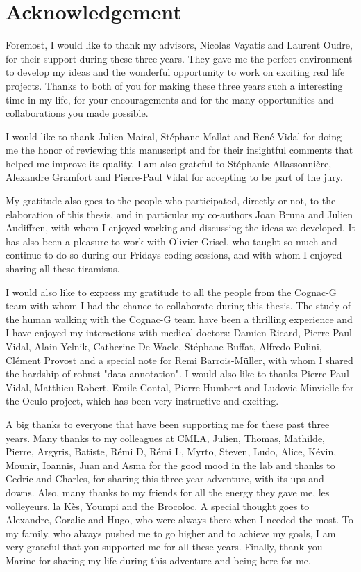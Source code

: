 \documentclass[../thesis.tex]{subfiles}
\begin{document}
\chapter*{Acknowledgement}


Foremost, I would like to thank my advisors, Nicolas Vayatis and Laurent Oudre, for
their support during these three years. They gave me the perfect environment to develop
my ideas and the wonderful opportunity to work on exciting real life projects. Thanks
to both of you for making these three years such a interesting time in my life,
for your encouragements and for the many opportunities and collaborations you
made possible.

I would like to thank Julien Mairal, Stéphane Mallat and René Vidal for
doing me the honor of reviewing this manuscript and for their insightful
comments that helped me improve its quality. I am also grateful to
Stéphanie Allassonnière, Alexandre Gramfort and Pierre-Paul Vidal for
accepting to be part of the jury.

My gratitude also goes to the people who participated, directly or not,
to the elaboration of this thesis, and in particular my co-authors
Joan Bruna and Julien Audiffren, with whom I enjoyed working and discussing
the ideas we developed. It has also been a pleasure to work with Olivier
Grisel, who taught so much and continue to do so during our Fridays coding
sessions, and with whom I enjoyed sharing all these tiramisus.

I would also like to express my gratitude to all the people from the Cognac-G team
with whom I had the chance to collaborate during this thesis. The study of the
human walking with the Cognac-G team have been a thrilling experience and I have
enjoyed my interactions with medical doctors: Damien Ricard, Pierre-Paul
Vidal, Alain Yelnik, Catherine De Waele, Stéphane Buffat, Alfredo Pulini, Clément
Provost and a special note for Remi Barrois-Müller, with whom I shared the hardship of
robust "data annotation". I would also like to thanks Pierre-Paul Vidal, Matthieu Robert,
Emile Contal, Pierre Humbert and Ludovic Minvielle for the Oculo project, which has
been very instructive and exciting.

A big thanks to everyone that have been supporting me for these past three
years. Many thanks to my colleagues at CMLA, Julien, Thomas, Mathilde, Pierre, Argyris,
Batiste, Rémi D, Rémi L, Myrto, Steven, Ludo, Alice, Kévin, Mounir, Ioannis, Juan and Asma
for the good mood in the lab and thanks to Cedric and Charles, for sharing this three year
adventure, with its ups and downs. Also, many thanks to my friends for all the energy they
gave me, les volleyeurs, la Kès, Youmpi and the Brocoloc. A special thought goes to Alexandre,
Coralie and Hugo, who were always there when I needed the most. To my family, who always
pushed me to go higher and to achieve my goals, I am very grateful that you supported me
for all these years. Finally, thank you Marine for sharing my life during this adventure
and being here for me.

\biblio{}
\end{document}
